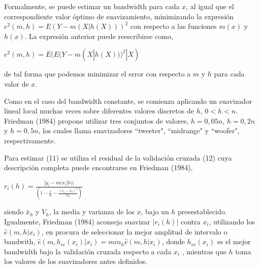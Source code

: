 \hspace*{0.4 cm} Formalmente, se puede estimar un bandwidth para cada $x$, al igual que el correspondiente valor \'optimo de suavizamiento, minimizando la expresi\'on $e^{2}(m,h) = E(Y - m(X|h(X)))^2$ con respecto a las funciones $m(x)$ y $h(x)$. La expresi\'on anterior puede reescribirse como,

\vspace*{0.2 cm}

\begin{center}
$\displaystyle{ e^{2}(m,h) = E(E(Y - m(X|h(X)))^2|X)  }$
\end{center}

\vspace*{0.2 cm}

\noindent de tal forma que podemos minimizar el error con respecto a $m$ y $h$ para cada valor de $x$.

\hspace*{0.4 cm} Como en el caso del bandwidth constante, se comienza aplicando un suavizador lineal local muchas veces sobre diferentes valores discretos de $h$, $0 < h < n$. Friedman (1984) propone utilizar tres conjuntos de valores, $h=0,05n$, $h=0,2n$ y $h=0,5n$, los cuales llama suavizadores ``tweeter", ``midrange" y ``woofer", respectivamente.

\hspace*{0.4 cm} Para estimar (11) se utiliza el residual de la validaci\'on cruzada (12) cuya descripci\'on completa puede encontrarse en Friedman (1984),

\vspace*{0.2 cm}

\begin{center}
$\displaystyle{ r_{i}(h)= \frac{|y_{i}-m(x_{i}|h)|}{\left(1-\frac{1}{h}-\frac{(x_{i}-\bar{x}_{h})^2}{V_{h}}\right)}  }$
\end{center}

\vspace*{0.2 cm}

\noindent siendo $\bar{x}_{h}$ y $V_{h}$, la media y varianza de los $x$, bajo un $h$ preeestablecido. Igualmente, Friedman (1984) aconseja suavizar $|r_{i}(h)|$ contra $x_{i}$, utilizando los $\hat{e}(m, h|x_{i})$, en procura de seleccionar la mejor amplitud de intervalo o bandwith, $\hat{e}(m, h_{vc}(x_{i})|x_{i})=min_{h} \hat{e}(m, h|x_{i})$, donde $h_{vc} (x_{i})$ es el mejor bandwidth bajo la validaci\'on cruzada respecto a cada $x_{i}$ , mientras que $h$ toma los valores de los suavizadores antes definidos.

